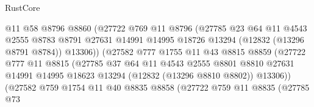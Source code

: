 \begin{lexlean}{RustCore}
\begin{coremodule}
                                @11
                                @58
                                @8796
                                @8860
                                (@27722
                                  @769
                                  @11
                                  @8796
                                  (@27785
                                    @23
                                    @64
                                    @11
                                    @4543
                                    @2555
                                    @8783
                                    @8791
                                    @27631
                                    @14991
                                    @14995
                                    @18726
                                    @13294
                                    (@12832 (@13296 @8791 @8784))
                                    @13306))
                                (@27582
                                  @777
                                  @1755
                                  @11
                                  @43
                                  @8815
                                  @8859
                                  (@27722
                                    @777
                                    @11
                                    @8815
                                    (@27785
                                      @37
                                      @64
                                      @11
                                      @4543
                                      @2555
                                      @8801
                                      @8810
                                      @27631
                                      @14991
                                      @14995
                                      @18623
                                      @13294
                                      (@12832 (@13296 @8810 @8802))
                                      @13306))
                                  (@27582
                                    @759
                                    @1754
                                    @11
                                    @40
                                    @8835
                                    @8858
                                    (@27722
                                      @759
                                      @11
                                      @8835
                                      (@27785
                                        @73

\end{coremodule}
\end{lexlean}
